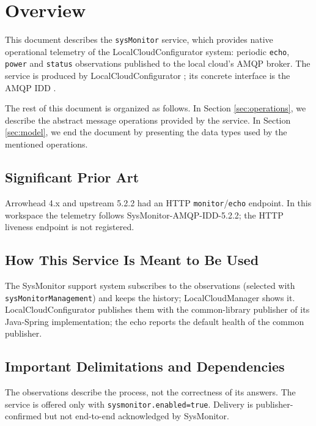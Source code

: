 \documentclass[a4paper]{arrowhead}
\begin{document}
\section{Overview}
\label{sec:overview}

This document describes the \texttt{sysMonitor} service, which provides native operational telemetry of the LocalCloudConfigurator system: periodic \texttt{echo}, \texttt{power} and \texttt{status} observations published to the local cloud's AMQP broker.
The service is produced by LocalCloudConfigurator \cite{lcc-sysd}; its concrete interface is the AMQP IDD \cite{lcc-sysMonitor-amqp-idd}.

The rest of this document is organized as follows.
In Section \ref{sec:operations}, we describe the abstract message operations provided by the service.
In Section \ref{sec:model}, we end the document by presenting the data types used by the mentioned operations.

\subsection{Significant Prior Art}

Arrowhead 4.x and upstream 5.2.2 had an HTTP \texttt{monitor}/\texttt{echo} endpoint. In this workspace the telemetry follows SysMonitor-AMQP-IDD-5.2.2; the HTTP liveness endpoint is not registered.

\subsection{How This Service Is Meant to Be Used}

The SysMonitor support system subscribes to the observations (selected with \texttt{sys\allowbreak{}Monitor\allowbreak{}Management}) and keeps the history; LocalCloudManager shows it. LocalCloudConfigurator publishes them with the common-library publisher of its Java-Spring implementation; the echo reports the default health of the common publisher.

\subsection{Important Delimitations and Dependencies}
\label{sec:delimitations}

The observations describe the process, not the correctness of its answers. The service is offered only with \texttt{sysmonitor.\allowbreak{}enabled=\allowbreak{}true}. Delivery is publisher-confirmed but not end-to-end acknowledged by SysMonitor.
\end{document}
